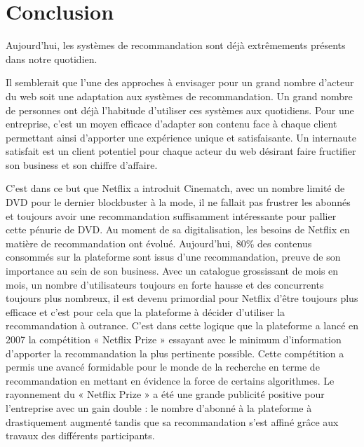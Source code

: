 \chapter*{Conclusion}
\label{sec:conclusion}




Aujourd’hui, les systèmes de recommandation sont déjà extrêmements présents dans notre quotidien. 

\vspace{5mm}


Il semblerait que l’une des approches à envisager pour un grand nombre d’acteur du web soit une adaptation aux systèmes de recommandation. Un grand nombre de personnes ont déjà l’habitude d’utiliser ces systèmes aux quotidiens. Pour une entreprise, c’est un moyen efficace d’adapter son contenu face à chaque client permettant ainsi d’apporter une expérience unique et satisfaisante. Un internaute satisfait est un client potentiel pour chaque acteur du web désirant faire fructifier son business et son chiffre d’affaire. 

\vspace{5mm}

C’est dans ce but que Netflix a introduit Cinematch, avec un nombre limité de DVD pour le dernier blockbuster à la mode, il ne fallait pas frustrer les abonnés et toujours avoir une recommandation suffisamment intéressante pour pallier cette pénurie de DVD. 
Au moment de sa digitalisation, les besoins de Netflix en matière de recommandation ont évolué. Aujourd’hui, 80\% des contenus consommés sur la plateforme sont issus d’une recommandation, preuve de son importance au sein de son business. Avec un catalogue grossissant de mois en mois, un nombre d’utilisateurs toujours en forte hausse et des concurrents toujours plus nombreux, il est devenu primordial pour Netflix d’être toujours plus efficace et c'est pour cela que la plateforme à décider d’utiliser la recommandation à outrance. C’est dans cette logique que la plateforme a lancé en 2007 la compétition « Netflix Prize » essayant avec le minimum d’information d’apporter la recommandation la plus pertinente possible. Cette compétition a permis une avancé formidable pour le monde de la recherche en terme de recommandation en mettant en évidence la force de certains algorithmes. Le rayonnement du « Netflix Prize » a été une grande publicité positive pour l’entreprise avec un gain double : le nombre d’abonné à la plateforme à drastiquement augmenté tandis que sa recommandation s’est affiné grâce aux travaux des différents participants.

